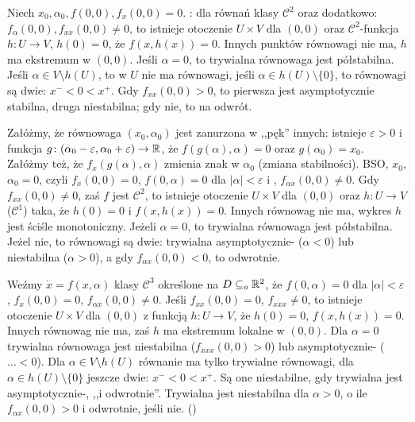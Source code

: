 Niech  $x_0, \alpha_0, f(0,0), f_x(0,0) = 0$.
: dla równań klasy $\mathscr C^2$ oraz dodatkowo: $f_\alpha(0, 0), f_{xx}(0,0) \neq 0$, to istnieje otoczenie $U \times V$ dla $(0,0)$ oraz $\mathscr C^2$-funkcja $h \colon U \to V$, $h(0) = 0$, że $f(x, h(x)) = 0$.
Innych punktów równowagi nie ma, $h$ ma ekstremum w $(0,0)$.
Jeśli $\alpha = 0$, to trywialna równowaga jest półstabilna.
Jeśli $\alpha \in V \setminus h(U)$, to w $U$ nie ma równowagi, jeśli $\alpha \in h(U) \setminus \{0\}$, to równowagi są dwie: $x^- < 0 < x^+$.
Gdy $f_{xx}(0,0) > 0$, to pierwsza jest asymptotycznie stabilna, druga niestabilna; gdy nie, to na odwrót.

Załóżmy,  że równowaga $(x_0, \alpha_0)$ jest zanurzona w ,,pęk'' innych: istnieje $\varepsilon > 0$ i funkcja $g \colon (\alpha_0 - \varepsilon, \alpha_0 + \varepsilon) \to \mathbb{R}$, że $f(g(\alpha), \alpha) = 0$ oraz $g(\alpha_0) = x_0$.
Załóżmy też, że $f_x(g(\alpha), \alpha)$ zmienia znak w $\alpha_0$ (zmiana stabilności).
BSO, $x_0$, $\alpha_0 = 0$, czyli $f_x(0,0) = 0$, $f(0, \alpha) = 0$ dla $|\alpha| < \varepsilon$ i , $f_{\alpha x} (0, 0) \neq 0$.
Gdy $f_{xx}(0, 0) \neq 0$, zaś $f$ jest $\mathscr C^2$, to istnieje otoczenie $U \times V$ dla $(0, 0)$ oraz $h \colon U \to V$ ($\mathscr C^1$) taka, że $h(0) = 0$ i $f(x, h(x)) = 0$.
Innych równowag nie ma, wykres $h$ jest ściśle monotoniczny.
Jeżeli $\alpha = 0$, to trywialna równowaga jest półstabilna.
Jeżel nie, to równowagi są dwie: trywialna asymptotycznie- ($\alpha < 0$) lub niestabilna ($\alpha > 0$), a gdy $f_{\alpha x}(0, 0) < 0$, to odwrotnie.

Weźmy  $\dot x = f(x, \alpha)$ klasy $\mathscr C^3$ określone na $D\subseteq_o \mathbb{R}^2$, że $f(0, \alpha) = 0$ dla $|\alpha| < \varepsilon$, $f_x(0, 0) = 0$, $f_{\alpha x} (0, 0) \neq 0$.
Jeśli $f_{xx}(0, 0) = 0$, $f_{xxx} \neq 0$, to istnieje otoczenie $U \times V$ dla $(0, 0)$ z funkcją $h \colon U \to V$, że $h(0) = 0$, $f(x, h(x)) = 0$.
Innych równowag nie ma, zaś $h$ ma ekstremum lokalne w $(0, 0)$.
Dla $\alpha = 0$ trywialna równowaga jest niestabilna ($f_{xxx}(0,0) > 0$) lub asymptotycznie- ($\ldots < 0$).
Dla $\alpha \in V \setminus h(U)$ równanie ma tylko trywialne równowagi, dla $\alpha \in h(U) \setminus \{0\}$ jeszcze dwie: $x^- < 0 < x^+$.
Są one niestabilne, gdy trywialna jest asymptotycznie-, ,,i odwrotnie''.
Trywialna jest niestabilna dla $\alpha > 0$, o ile $f_{\alpha x}(0, 0) > 0$ i odwrotnie, jeśli nie.
()

